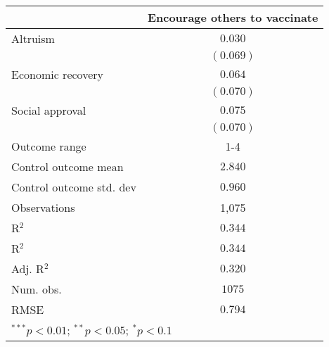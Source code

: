 
\begin{table}
\begin{center}
\begin{tabular}{l c}
\hline
 & Encourage others to vaccinate \\
\hline
Altruism                 & $0.030$   \\
                         & $(0.069)$ \\
Economic recovery        & $0.064$   \\
                         & $(0.070)$ \\
Social approval          & $0.075$   \\
                         & $(0.070)$ \\
\hline
Outcome range            & 1-4       \\
Control outcome mean     & $2.840$   \\
Control outcome std. dev & $0.960$   \\
Observations             & 1,075     \\
R$^{2}$                  & $0.344$   \\
R$^2$                    & $0.344$   \\
Adj. R$^2$               & $0.320$   \\
Num. obs.                & $1075$    \\
RMSE                     & $0.794$   \\
\hline
\multicolumn{2}{l}{\scriptsize{$^{***}p<0.01$; $^{**}p<0.05$; $^{*}p<0.1$}}
\end{tabular}
\caption{}
\label{table:Tables and Figures/SI_table23_motiv_Mexico_encourage1-4}
\end{center}
\end{table}
